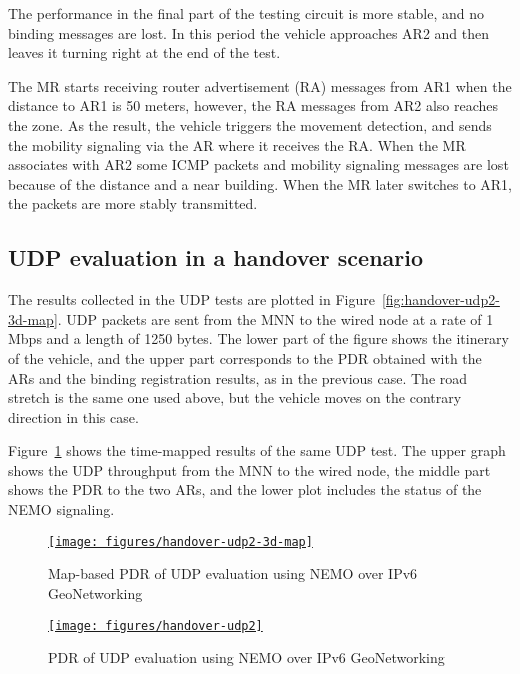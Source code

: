 \documentclass[fonts]{icst}
\begin{document}
The performance in the final part of the testing circuit is more stable, and no
binding messages are lost. In this period the vehicle approaches AR2 and then
leaves it turning right at the end of the test.

The MR starts receiving router advertisement (RA) messages from AR1 when the
distance to AR1 is 50 meters, however, the RA messages from AR2 also reaches the
zone. As the result, the vehicle triggers the movement detection, and sends the
mobility signaling via the AR where it receives the RA. When the MR associates
with AR2 some ICMP packets and mobility signaling messages are lost because of
the distance and a near building. When the MR later switches to AR1, the packets
are more stably transmitted. 





\subsection{UDP evaluation in a handover scenario}

The results collected in the UDP tests are plotted in
Figure~\ref{fig:handover-udp2-3d-map}. UDP packets are sent from the MNN to the
wired node at a rate of 1 Mbps and a length of 1250 bytes. The lower part of the
figure shows the itinerary of the vehicle, and the upper part corresponds to the
PDR obtained with the ARs and the binding registration results, as in the
previous case. The road stretch is the same one used above, but the vehicle
moves on the contrary direction in this case.

Figure~\ref{fig:handover-udp2} shows the time-mapped results of the same UDP test. The
upper graph shows the UDP throughput from the MNN to the wired node, the middle part
shows the PDR to the two ARs, and the lower plot includes the status of the NEMO
signaling.

\begin{figure}[htbp]
   \begin{center}
    \href{http://anavanet.net/demo-vienna/?analysis=1296759090}{
    \texttt{[image: figures/handover-udp2-3d-map]}}
      \caption{Map-based PDR of UDP evaluation using NEMO over IPv6 GeoNetworking}
      \label{fig:handover-udp2-3d-map}
\href{http://anavanet.net/demo-vienna/?analysis=1296759090}{
       \texttt{[image: figures/handover-udp2]}}
      \caption{PDR of UDP evaluation using NEMO over IPv6 GeoNetworking}
      \label{fig:handover-udp2}
  \end{center}
\end{figure}
\end{document}
